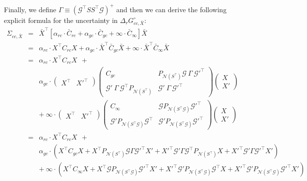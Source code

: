 \documentclass{article}
\newcommand{\Gmat}{\mathcal{G}}
\newcommand{\PNmat}[1]{P_{\mathcal{N}\left(#1\right)}}
\begin{document}
Finally, we define $\Gamma \equiv \left(\Gmat^{\top}SS^{\top}\Gmat\right)^{+}$ and then we can derive the following explicit formula for the uncertainty in $\Delta_{r}G_{cc,\bar{X}}^{\circ}$:
\begin{eqnarray}
\Sigma_{cc,\bar{X}}
&=& 
\bar{X}^{\top} \left[ \alpha_{rc}\cdot \bar{C}_{rc} + \alpha_{gc}\cdot \bar{C}_{gc} + \infty\cdot \bar{C}_{\infty}  \right] \bar{X}
\\ &=&
\alpha_{rc} \cdot X^{\top} C_{rc} X + \alpha_{gc} \cdot \bar{X}^{\top} \bar{C}_{gc} \bar{X} + \infty \cdot \bar{X}^{\top} \bar{C}_{\infty} \bar{X}
\nonumber\\ &=&
\alpha_{rc} \cdot X^{\top} C_{rc} X ~~+
\nonumber\\ &&
\alpha_{gc} \cdot \left( \begin{array}{c|c} X^\top & X'^\top \end{array} \right)
\left( \begin{array}{c|c}
		C_{gc} &
		\PNmat{S^\top} \Gmat ~ \Gamma ~ \Gmat'^\top \\ \hline
		\Gmat' ~ \Gamma ~ \Gmat^\top \PNmat{S^\top} &
		\Gmat' ~ \Gamma ~ \Gmat'^\top
	\end{array} \right)
 \left( \begin{array}{c} X \\ \hline X' \end{array} \right)
\nonumber\\ &&+~
\infty \cdot \left( \begin{array}{c|c} X^\top & X'^\top \end{array} \right)
\left( \begin{array}{c|c}
		C_\infty &
		\Gmat \PNmat{S^\top\Gmat} \Gmat'^\top \\ \hline
		\Gmat' \PNmat{S^\top\Gmat} \Gmat^\top &
		\Gmat' \PNmat{S^\top\Gmat} \Gmat'^\top
 \end{array}\right) \left( \begin{array}{c} X \\ \hline X' \end{array} \right)
\nonumber\\ &=&
\alpha_{rc} \cdot X^{\top} C_{rc} X ~~+
\nonumber\\ &&
\alpha_{gc} \cdot \left(
	X^\top C_{gc} X +
	X^\top \PNmat{S^\top} \Gmat  \Gamma \Gmat'^\top                X' + 
	X'^\top               \Gmat' \Gamma \Gmat^\top  \PNmat{S^\top} X  +
	X'^\top               \Gmat' \Gamma \Gmat'^\top                X'
\right)
\nonumber\\ &&+~
\infty \cdot \left(
	X^\top C_{\infty} X +
	X^\top \Gmat \PNmat{S^\top\Gmat} \Gmat'^\top X' +
	X'^\top \Gmat' \PNmat{S^\top\Gmat} \Gmat^\top X +
	X'^\top \Gmat' \PNmat{S^\top\Gmat} \Gmat'^\top X'
\right)
\nonumber
\label{eq:standard_error}
\end{eqnarray}
\end{document}
